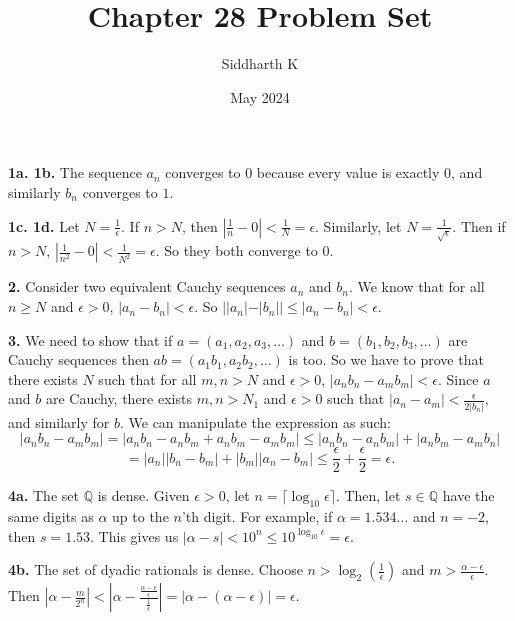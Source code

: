 \documentclass{article}
\title{Chapter 28 Problem Set}
\author{Siddharth K}
\date{May 2024}
\begin{document}
\maketitle

\textbf{1a. 1b.} The sequence $a_n$ converges to $0$ because every value is exactly $0$, and similarly $b_n$ converges to $1$.
\newline

\textbf{1c. 1d.} Let $N = \frac{1}{\epsilon}$. If $n > N$, then $|\frac{1}{n} - 0| < \frac{1}{N} = \epsilon$. Similarly, let $N = \frac{1}{\sqrt{\epsilon}}$. Then if $n > N$, $|\frac{1}{n^2} - 0| < \frac{1}{N^2} = \epsilon$. So they both converge to $0$.
\newline

\textbf{2.} Consider two equivalent Cauchy sequences $a_n$ and $b_n$. We know that for all $n \ge N$ and $\epsilon > 0$, $|a_n - b_n| < \epsilon$. So $||a_n| - |b_n|| \le |a_n - b_n| < \epsilon$.
\newline

\textbf{3.} We need to show that if $a = (a_1, a_2, a_3, \ldots)$ and $b = (b_1, b_2, b_3, \ldots)$ are Cauchy sequences then $ab = (a_1b_1, a_2b_2, \ldots)$ is too. So we have to prove that there exists $N$ such that for all $m, n > N$ and $\epsilon > 0$, $|a_nb_n - a_mb_m| < \epsilon$. Since $a$ and $b$ are Cauchy, there exists $m, n > N_1$ and $\epsilon > 0$ such that $|a_n - a_m| < \frac{\epsilon}{2|b_n|}$, and similarly for $b$. We can manipulate the expression as such: $$|a_nb_n - a_mb_m| = |a_nb_n - a_nb_m + a_nb_m - a_mb_m| \le |a_nb_n - a_nb_m| + |a_nb_m - a_mb_n|$$$$ = |a_n||b_n - b_m| + |b_m||a_n - b_m| \le \frac{\epsilon}{2} + \frac{\epsilon}{2} = \epsilon.$$
\newline

\textbf{4a.} The set $\mathbb{Q}$ is dense. Given $\epsilon > 0$, let $n = \lceil \log_{10}\epsilon \rceil$. Then, let $s \in \mathbb{Q}$ have the same digits as $\alpha$ up to the $n$'th digit. For example, if $\alpha = 1.534\ldots$ and $n = -2$, then $s = 1.53$. This gives us $|\alpha - s| < 10^n \le 10^{\log_{10}\epsilon} = \epsilon$.
\newline

\textbf{4b.} The set of dyadic rationals is dense. Choose $n > \log_{2}\left(\frac{1}{\epsilon}\right)$ and $m > \frac{\alpha - \epsilon}{\epsilon}$. Then $|\alpha - \frac{m}{2^n}| < |\alpha - \frac{\frac{\alpha - \epsilon}{\epsilon}}{\frac{1}{\epsilon}}| = |\alpha - (\alpha - \epsilon)| = \epsilon$.
\newline
\end{document}
